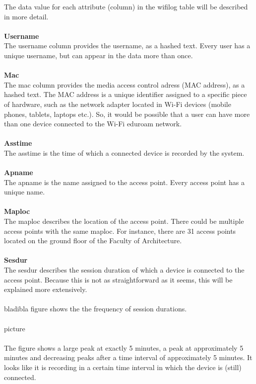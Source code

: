 The data value for each attribute (column) in the wifilog table will be described in more detail.\\\\
\textbf{Username}\\
The username column provides the username, as a hashed text. Every user has a unique username, but can appear in the data more than once.
\\\\
\textbf{Mac}\\
The mac column provides the media access control adress (MAC address), as a hashed text. The MAC address is a unique identifier assigned to a specific piece of hardware, such as the network adapter located in Wi-Fi devices (mobile phones, tablets, laptops etc.). So, it would be possible that a user can have more than one device connected to the Wi-Fi eduroam network.
\\\\
\textbf{Asstime}\\
The asstime is the time of which a connected device is recorded by the system.
\\\\
\textbf{Apname}\\
The apname is the name assigned to the access point. Every access point has a unique name. 
\\\\
\textbf{Maploc}\\
The maploc describes the location of the access point. There could be multiple access points with the same maploc. For instance, there are 31 access points located on the ground floor of the Faculty of Architecture.
\\\\
\textbf{Sesdur}\\
The sesdur describes the session duration of which a device is connected to the access point. Because this is not as straightforward as it seems, this will be explained more extensively.
\\\\
bladibla figure shows the the frequency of session durations.
\\\\
picture
\\\\
The figure shows a large peak at exactly 5 minutes, a peak at approximately 5 minutes and decreasing peaks after a time interval of approximately 5 minutes. It looks like it is recording in a certain time interval in which the device is (still) connected. \\\\
